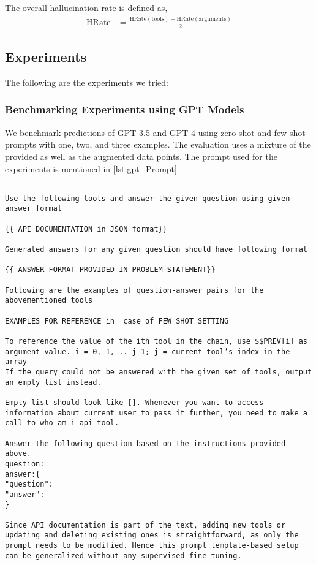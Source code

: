 \documentclass[10pt,twocolumn,letterpaper]{article}
\begin{document}
The overall hallucination rate is defined as,
\begin{align*}
    \text{HRate} &= \frac{\text{HRate}(\text{tools}) + \text{HRate}(\text{arguments})}{2}
\end{align*}


\subsection{Experiments}
The following are the experiments we tried:
\subsubsection{Benchmarking Experiments using GPT Models}
We benchmark predictions of GPT-3.5 and GPT-4\cite{openai2023gpt4} using zero-shot and few-shot prompts with one, two, and three examples. The evaluation uses a mixture of the provided as well as the augmented data points. The prompt used for the experiments is mentioned in \autoref{lst:gpt_Prompt} 
\begin{lstlisting}[style=json, caption={Prompt template for benchmarking experiments on GPT models}, label={lst:gpt_Prompt}]

Use the following tools and answer the given question using given answer format

{{ API DOCUMENTATION in JSON format}}

Generated answers for any given question should have following format

{{ ANSWER FORMAT PROVIDED IN PROBLEM STATEMENT}}

Following are the examples of question-answer pairs for the abovementioned tools

EXAMPLES FOR REFERENCE in  case of FEW SHOT SETTING

To reference the value of the ith tool in the chain, use $$PREV[i] as argument value. i = 0, 1, .. j-1; j = current tool’s index in the array
If the query could not be answered with the given set of tools, output an empty list instead.

Empty list should look like []. Whenever you want to access information about current user to pass it further, you need to make a call to who_am_i api tool.

Answer the following question based on the instructions provided above.
question:
answer:{
"question":
"answer":
}

Since API documentation is part of the text, adding new tools or updating and deleting existing ones is straightforward, as only the prompt needs to be modified. Hence this prompt template-based setup can be generalized without any supervised fine-tuning.

\end{lstlisting}
\end{document}
